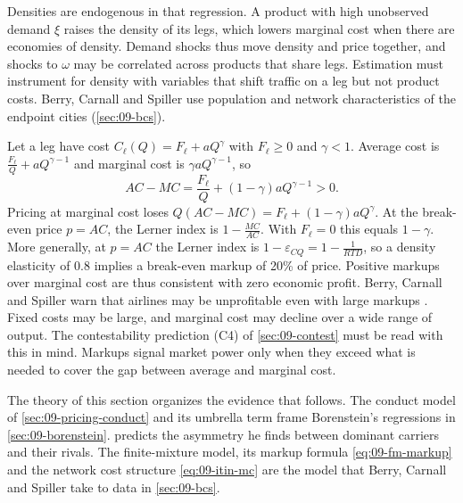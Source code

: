 Densities are endogenous in that regression. A product with high unobserved demand $\xi$ raises the
density of its legs, which lowers marginal cost when there are economies of density. Demand shocks thus
move density and price together, and shocks to $\omega$ may be correlated across products that share
legs. Estimation must instrument for density with variables that shift traffic on a leg but not product
costs. Berry, Carnall and Spiller use population and network characteristics of the endpoint cities
(\cref{sec:09-bcs}).

\begin{remark}\label{rem:09-markups-profits}
Let a leg have cost $C_\ell(Q)=F_\ell+aQ^\gamma$ with $F_\ell\ge0$ and $\gamma<1$. Average cost is
$\frac{F_\ell}{Q}+aQ^{\gamma-1}$ and marginal cost is $\gamma aQ^{\gamma-1}$, so
\begin{equation*}
AC-MC=\frac{F_\ell}{Q}+(1-\gamma)aQ^{\gamma-1}>0 .
\end{equation*}
Pricing at marginal cost loses $Q(AC-MC)=F_\ell+(1-\gamma)aQ^\gamma$. At the break-even price $p=AC$, the
Lerner index is $1-\frac{MC}{AC}$. With $F_\ell=0$ this equals $1-\gamma$. More generally, at $p=AC$ the
Lerner index is $1-\varepsilon_{CQ}=1-\frac{1}{RTD}$, so a density elasticity of 0.8 implies a
break-even markup of 20\% of price. Positive markups over marginal cost are thus consistent with zero
economic profit. Berry, Carnall and Spiller warn that airlines may be unprofitable even with large
markups \citep[p.~16]{BerryCarnallSpiller2006}. Fixed costs may be large, and marginal cost may decline
over a wide range of output. The contestability prediction (C4) of \cref{sec:09-contest}
must be read with this in mind. Markups signal market power only when they exceed what is needed to cover
the gap between average and marginal cost.
\end{remark}

The theory of this section organizes the evidence that follows. The conduct model of
\cref{sec:09-pricing-conduct} and its umbrella term frame Borenstein's regressions in
\cref{sec:09-borenstein}.  predicts the asymmetry he finds between dominant
carriers and their rivals. The finite-mixture model, its markup formula \eqref{eq:09-fm-markup} and the
network cost structure \eqref{eq:09-itin-mc} are the model that Berry, Carnall and Spiller take to data in
\cref{sec:09-bcs}.
